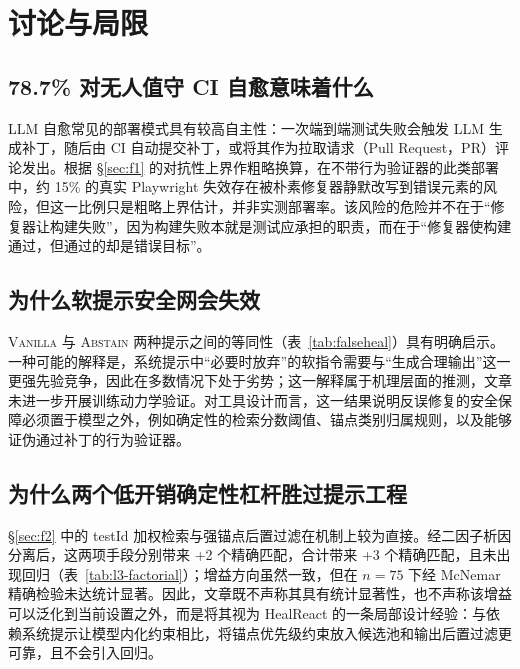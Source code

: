 \section{讨论与局限}
\label{sec:discussion}

\subsection{78.7\% 对无人值守 CI 自愈意味着什么}
LLM 自愈常见的部署模式具有较高自主性：一次端到端测试失败会触发 LLM 生成补丁，随后由 CI 自动提交补丁，或将其作为拉取请求（Pull Request，PR）评论发出。根据 \S\ref{sec:f1} 的对抗性上界作粗略换算，在不带行为验证器的此类部署中，约 15\% 的真实 Playwright 失效存在被朴素修复器静默改写到错误元素的风险，但这一比例只是粗略上界估计，并非实测部署率。该风险的危险并不在于“修复器让构建失败”，因为构建失败本就是测试应承担的职责，而在于“修复器使构建通过，但通过的却是错误目标”。

\subsection{为什么软提示安全网会失效}
\textsc{Vanilla} 与 \textsc{Abstain} 两种提示之间的等同性（表~\ref{tab:falseheal}）具有明确启示。一种可能的解释是，系统提示中“必要时放弃”的软指令需要与“生成合理输出”这一更强先验竞争，因此在多数情况下处于劣势；这一解释属于机理层面的推测，文章未进一步开展训练动力学验证。对工具设计而言，这一结果说明反误修复的安全保障必须置于模型之外，例如确定性的检索分数阈值、锚点类别归属规则，以及能够证伪通过补丁的行为验证器。

\subsection{为什么两个低开销确定性杠杆胜过提示工程}
\S\ref{sec:f2} 中的 testId 加权检索与强锚点后置过滤在机制上较为直接。经二因子析因分离后，这两项手段分别带来 +2 个精确匹配，合计带来 +3 个精确匹配，且未出现回归（表~\ref{tab:l3-factorial}）；增益方向虽然一致，但在 $n=75$ 下经 McNemar 精确检验未达统计显著。因此，文章既不声称其具有统计显著性，也不声称该增益可以泛化到当前设置之外，而是将其视为 HealReact 的一条局部设计经验：与依赖系统提示让模型内化约束相比，将锚点优先级约束放入候选池和输出后置过滤更可靠，且不会引入回归。

